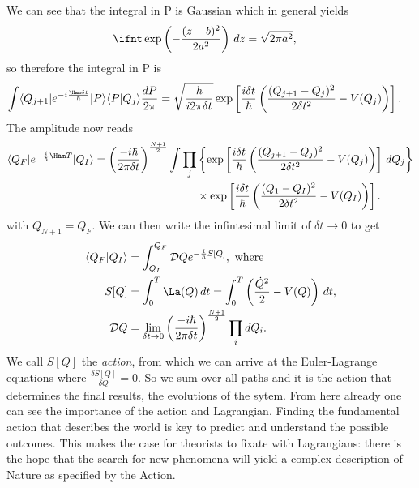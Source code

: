 \documentclass[relqm.tex]{subfiles}
\begin{document}
We can see that the integral in P is Gaussian which in general yields
\begin{align}
    \ifnt \exp\left(-\frac{(z-b)^2}{2a^2}\right)\,dz &= \sqrt{2\pi a^2},
\end{align}
so therefore the integral in P is
\begin{align}
    \int \langle Q_{j+1}|e^{-i\frac{\Ham\delta t}{\hbar}}|P\rangle\langle P|Q_j\rangle\frac{dP}{2\pi} &= \sqrt{\frac{\hbar}{i2\pi\delta t}}\exp\left[\frac{i\delta t}{\hbar}\left(\frac{(Q_{j+1}-Q_j)^2}{2\delta t^2} - V(Q_j)\right)\right].
\end{align}
The amplitude now reads
\begin{align}
    \begin{split}
        \langle Q_F|e^{-\frac{i}{\hbar}\Ham T}|Q_I\rangle = \left(\frac{-i\hbar}{2\pi\delta t}\right)^{\frac{N+1}{2}} \int \prod_j &\left\{\exp\left[\frac{i\delta t}{\hbar}\left(\frac{(Q_{j+1}-Q_j)^2}{2\delta t^2}-V(Q_j)\right)\right]\,dQ_j\right\} \\
                                                                                                                                   &\times \exp\left[\frac{i\delta t}{\hbar}\left(\frac{(Q_1-Q_I)^2}{2\delta t^2}-V(Q_I)\right)\right].
    \end{split}
\end{align}
with $Q_{N+1}=Q_F$.
We can then write the infintesimal limit of $\delta t\to0$ to get
\begin{align}
    \langle Q_F|Q_I\rangle &= \int_{Q_I}^{Q_F} \mathcal{D}Qe^{-\frac{i}{\hbar}S[Q]}, \text{ where }\\
    S[Q] &= \int_0^T \La(Q)\,dt = \int_0^T \left(\frac{\dot{Q}^2}{2}-V(Q)\right)\,dt, \\
    \mathcal{D}Q &= \lim_{\delta t\to0} \left(\frac{-i\hbar}{2\pi\delta t}\right)^{\frac{N+1}{2}}\prod_i dQ_i.
\end{align}
We call $S[Q]$ the \emph{action}, from which we can arrive at the Euler-Lagrange equations where $\frac{\delta S[Q]}{\delta Q} = 0$.
So we sum over all paths and it is the action that determines the final results, the evolutions of the sytem. 
From here already one can see the importance of the action and Lagrangian. Finding the fundamental action that describes the world is key to predict and understand the possible outcomes. 
This makes the case for theorists to fixate with Lagrangians: there is the hope that the search for new phenomena will yield a complex description of Nature as specified by the Action. 
\end{document}
